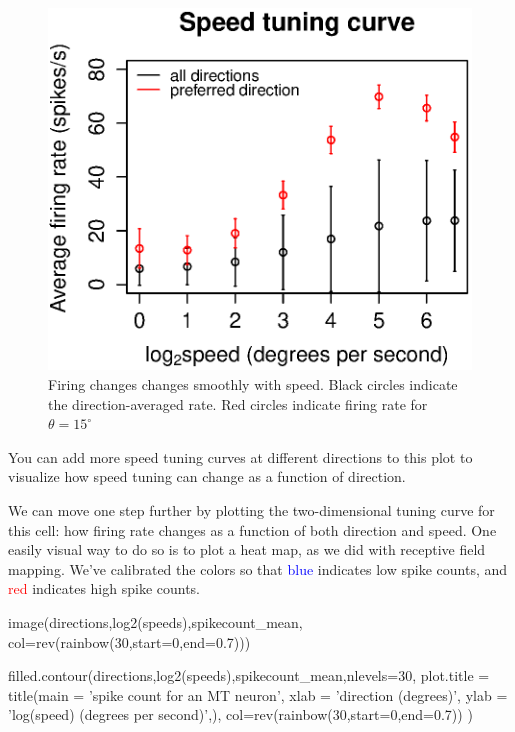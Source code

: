 \documentclass[
letterpaper, %
11pt, %
 oneside, 
onecolumn, %
]{memoir}
\numberwithin{Exercise}{chapter}
\begin{document}
\begin{figure}
\centering
\includegraphics[scale=0.7]{spdtune_log_wEB} 
\caption{Firing changes changes smoothly with speed.  Black circles indicate the direction-averaged rate. Red circles
indicate firing rate for $\theta=15^{\circ}$ }
\end{figure}
 
You can add more speed tuning curves at different directions to this plot to visualize how speed tuning can change as a function of direction. 

We can move one step further by plotting the two-dimensional tuning curve for this cell: how firing rate changes as a function of both direction and speed. One easily visual way to do so is to plot a heat map, as we did with receptive field mapping. We've calibrated the colors so that \textcolor{blue}{blue} indicates low spike counts, and \textcolor{red}{red} indicates high spike counts. 

\begin{shortrcode}   
image(directions,log2(speeds),spikecount_mean, col=rev(rainbow(30,start=0,end=0.7)))
\end{shortrcode}   


\begin{shortrcode}   
filled.contour(directions,log2(speeds),spikecount_mean,nlevels=30,
               plot.title = title(main = 'spike count for an MT neuron',
                                  xlab =  'direction (degrees)',
                                  ylab = 'log(speed) (degrees per second)',),
               col=rev(rainbow(30,start=0,end=0.7))
)
\end{shortrcode} 
\end{document}
